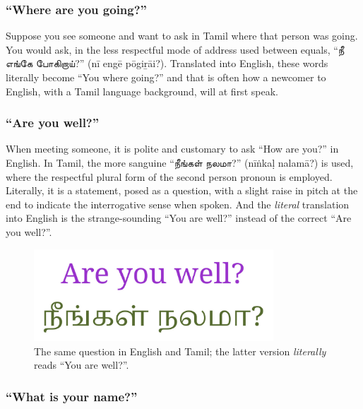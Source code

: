 \documentclass[
  a4paper,
]{article}
\begin{document}
\hypertarget{where-are-you-going}{%
\subsubsection{``Where are you going?''}\label{where-are-you-going}}

Suppose you see someone and want to ask in Tamil where that person was
going. You would ask, in the less respectful mode of address used
between equals, ``நீ எங்கே போகிறாய்?'' (nī engē pōgiṟāi?). Translated
into English, these words literally become ``You where going?'' and that
is often how a newcomer to English, with a Tamil language background,
will at first speak.

\hypertarget{are-you-well}{%
\subsubsection{``Are you well?''}\label{are-you-well}}

When meeting someone, it is polite and customary to ask ``How are you?''
in English. In Tamil, the more sanguine ``நீங்கள் நலமா?'' (nīṅkaḷ
nalamā?) is used, where the respectful plural form of the second person
pronoun is employed. Literally, it is a statement, posed as a question,
with a slight raise in pitch at the end to indicate the interrogative
sense when spoken. And the \emph{literal} translation into English is
the strange-sounding ``You are well?'' instead of the correct ``Are you
well?''.

\begin{figure}
\hypertarget{fig:questions}{%
\centering
\includegraphics[width=0.8\textwidth,height=\textheight]{images/engtam.jpg}
\caption{The same question in English and Tamil; the latter version
\emph{literally} reads ``You are well?''.}\label{fig:questions}
}
\end{figure}

\hypertarget{what-is-your-name}{%
\subsubsection{``What is your name?''}\label{what-is-your-name}}
\end{document}
